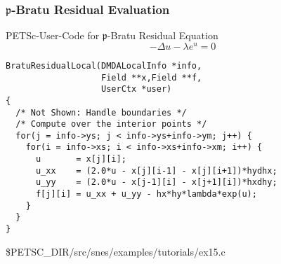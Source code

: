 \begin{frame}[fragile]
\frametitle{$\mathfrak{p}$-Bratu Residual Evaluation}

\begin{block}{PETSc-User-Code for $\mathfrak{p}$-Bratu Residual Equation}
\begin{equation*}
  -\Delta u - \lambda e^{u} = 0
\end{equation*}
\end{block}
\small
\begin{lstlisting}
BratuResidualLocal(DMDALocalInfo *info,
                   Field **x,Field **f,
                   UserCtx *user)
{
  /* Not Shown: Handle boundaries */
  /* Compute over the interior points */
  for(j = info->ys; j < info->ys+info->ym; j++) {
    for(i = info->xs; i < info->xs+info->xm; i++) {
      u       = x[j][i];
      u_xx    = (2.0*u - x[j][i-1] - x[j][i+1])*hydhx;
      u_yy    = (2.0*u - x[j-1][i] - x[j+1][i])*hxdhy;
      f[j][i] = u_xx + u_yy - hx*hy*lambda*exp(u);
    }
  }
}
\end{lstlisting}

\begin{center}\small
\$PETSC\_DIR/src/snes/examples/tutorials/ex15.c
\end{center}
\end{frame}
